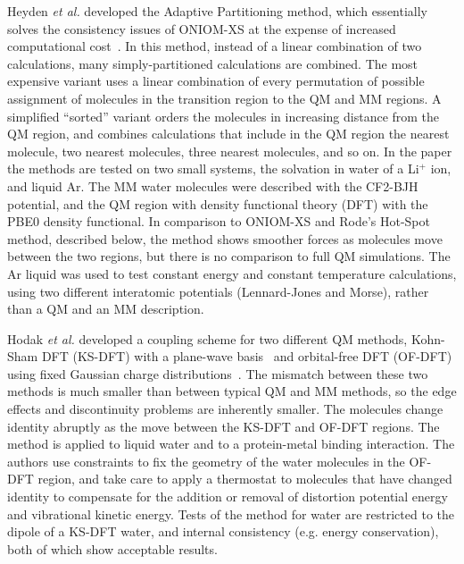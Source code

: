 \documentclass[11pt]{revtex4}
\begin{document}
Heyden {\it et al.} developed the Adaptive Partitioning method,
which essentially solves the consistency issues of ONIOM-XS at the
expense of increased computational cost~\cite{heyden_j_phys_chem_b_2007a}.
In this method, instead of a linear combination of two calculations,
many simply-partitioned calculations are combined.  The most expensive
variant uses a linear combination of every permutation of possible
assignment of molecules in the transition region to the QM and MM
regions.  A simplified ``sorted'' variant orders the molecules in
increasing distance from the QM region, and combines calculations
that include in the QM region the nearest molecule, two nearest
molecules, three nearest molecules, and so on.  In the paper the
methods are tested on two small systems, the solvation in water of
a Li$^+$ ion, and liquid Ar.  The MM water molecules were described
with the CF2-BJH potential, and the QM region with density functional
theory (DFT) with the PBE0 density functional.  In comparison to
ONIOM-XS and Rode's Hot-Spot method, described below, the method
shows smoother forces as molecules move between the two regions,
but there is no comparison to full QM simulations.  The Ar liquid
was used to test constant energy and constant temperature calculations,
using two different interatomic potentials (Lennard-Jones and Morse),
rather than a QM and an MM description.

Hodak {\it et al.} developed a coupling scheme for two different
QM methods, Kohn-Sham DFT (KS-DFT) with a plane-wave basis~\cite{kohn_phys_rev_1965a}
and orbital-free DFT (OF-DFT) using fixed Gaussian charge
distributions~\cite{hodak_j_chem_phys_2008a}.  The mismatch between
these two methods is much smaller than between typical QM and MM
methods, so the edge effects and discontinuity problems are inherently
smaller.  The molecules change identity abruptly as the move between
the KS-DFT and OF-DFT regions.  The method is applied to liquid
water and to a protein-metal binding interaction.  The authors use
constraints to fix the geometry of the water molecules in the OF-DFT
region, and take care to apply a thermostat to molecules that have
changed identity to compensate for the addition or removal of
distortion potential energy and vibrational kinetic energy.  Tests
of the method for water are restricted to the dipole of a KS-DFT
water, and internal consistency (e.g. energy conservation), both
of which show acceptable results.

\end{document}
